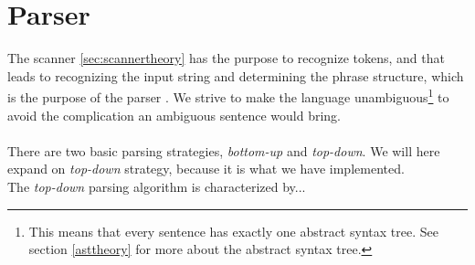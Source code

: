 \section{Parser}
\label{sec:parser}
The scanner \ref{sec:scannertheory} has the purpose to recognize tokens, and that leads to recognizing the input string and determining the phrase structure, which is the purpose of the parser \cite{misc:spo}. We strive to make the language unambiguous\footnote{This means that every sentence has exactly one abstract syntax tree. See section \ref{asttheory} for more about the abstract syntax tree.} to avoid the complication an ambiguous sentence would bring.\\
\\
There are two basic parsing strategies, \textit{bottom-up} and \textit{top-down}. We will here expand on \textit{top-down} strategy, because it is what we have implemented.\\ \indent
The \textit{top-down} parsing algorithm is characterized by...